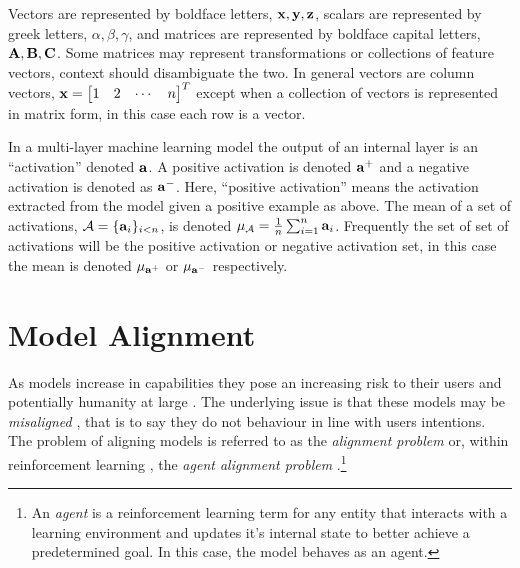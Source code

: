 Vectors are represented by boldface letters, $\mathbf{x}, \mathbf{y}, \mathbf{z}$, scalars are represented by greek letters, $\alpha, \beta, \gamma$, and matrices are represented by boldface capital letters, $\mathbf{A}, \mathbf{B}, \mathbf{C}$.
Some matrices may represent transformations or collections of feature vectors, context should disambiguate the two.
In general vectors are column vectors, $\vx = \begin{bmatrix*}
    1 & 2 & \cdots & n
\end{bmatrix*}^T$ except when a collection of vectors is represented in matrix form, in this case each row is a vector.

In a multi-layer machine learning model the output of an internal layer is an ``activation'' denoted $\mathbf{a}$.
A positive activation is denoted $\mathbf{a}^+$ and a negative activation is denoted as $\mathbf{a}^-$. Here, ``positive activation'' means the activation extracted from the model given a positive example as above.
The mean of a set of activations, $\mathcal{A} = \{\mathbf{a}_i\}_{i < n}$, is denoted $\mu_\mathcal{A} = \frac{1}{n}\sum_{i=1}^{n}\mathbf{a}_i$.
Frequently the set of set of activations will be the positive activation or negative activation set, in this case the mean is denoted $\mu_{\mathbf{a}^+}$ or $\mu_{\mathbf{a}^-}$ respectively.

\section{Model Alignment}

As models increase in capabilities \citep{} they pose an increasing risk to their users \citep{c.ai, psychosis} and potentially humanity at large \citep{survellience, deepfakes, disempowerment}.
The underlying issue is that these models may be \emph{misaligned} \citep{agent-alignment}, that is to say they do not behaviour in line with users intentions.
The problem of aligning models is referred to as the \emph{alignment problem} or, within reinforcement learning \cite{rl}, the \emph{agent alignment problem} \citep{agent-alignment}.\footnote{An \emph{agent} is a reinforcement learning term for any entity that interacts with a learning environment and updates it's internal state to better achieve a predetermined goal. In this case, the model behaves as an agent.}


